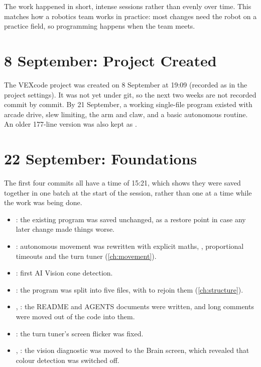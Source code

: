The work happened in short, intense sessions rather than evenly over time. This
matches how a robotics team works in practice: most changes need the robot on a
practice field, so programming happens when the team meets.

\section{8 September: Project Created}

The VEXcode project was created on 8 September at 19:09 (recorded as
 in the project settings). It was not yet under git, so the
next two weeks are not recorded commit by commit. By 21 September, a working
single-file program existed with arcade drive, slew limiting, the arm and claw,
and a basic autonomous routine. An older 177-line version was also kept as
.

\section{22 September: Foundations}

The first four commits all have a time of 15:21, which shows they were saved
together in one batch at the start of the session, rather than one at a time
while the work was being done.

\begin{itemize}
  \item {}: the existing program was saved unchanged, as a restore
    point in case any later change made things worse.
  \item {}: autonomous movement was rewritten with explicit maths,
    , proportional timeouts and the turn tuner (\cref{ch:movement}).
  \item {}: first AI Vision cone detection.
  \item {}: the program was split into five files, with
     to rejoin them (\cref{ch:structure}).
  \item {}, : the README and AGENTS documents were
    written, and long comments were moved out of the code into them.
  \item {}: the turn tuner's screen flicker was fixed.
  \item {}, : the vision diagnostic was moved to
    the Brain screen, which revealed that colour detection was switched off.
\end{itemize}

